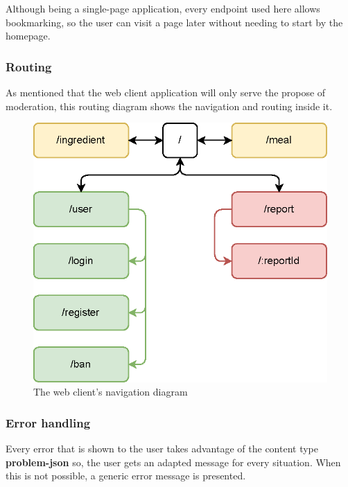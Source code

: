 Although being a single-page application, every endpoint used here allows bookmarking, so the user can visit a page
later without needing to start by the homepage.

\subsubsection{Routing}

As mentioned that the web client application will only serve the propose of moderation, this routing diagram shows the
navigation and routing inside it.

\begin{figure}[H]
    \begin{center}
        \includegraphics[scale=0.7]{_figures/web-client-endpoints.eps}
        \caption{The web client's navigation diagram}
    \end{center}
\end{figure}

\subsubsection{Error handling}

Every error that is shown to the user takes advantage of the content type \textbf{problem-json}
so, the user gets an adapted message for every situation. When this is not possible, a generic error
message is presented.\\

